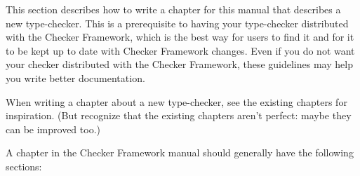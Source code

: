 



This section describes how to write a chapter for this manual that
describes a new type-checker.  This is a prerequisite to having your
type-checker distributed with the Checker Framework, which is the best way
for users to find it and for it to be kept up to date with Checker
Framework changes.  Even if you do not want your checker distributed with
the Checker Framework, these guidelines may help you write better
documentation.

When writing a chapter about a new type-checker, see the existing chapters
for inspiration.  (But recognize that the existing chapters aren't perfect:
maybe they can be improved too.)

A chapter in the Checker Framework manual should generally have the
following sections:

